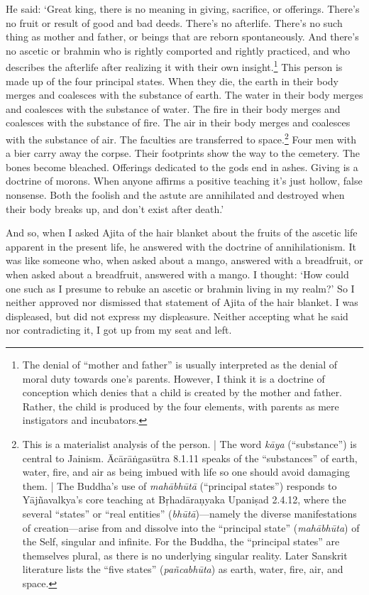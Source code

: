 \documentclass[12pt,openany]{book}%
\begin{document}
He said: ‘Great king, there is no meaning in giving, sacrifice, or offerings. There’s no fruit or result of good and bad deeds. There’s no afterlife. There’s no such thing as mother and father, or beings that are reborn spontaneously. And there’s no ascetic or brahmin who is rightly comported and rightly practiced, and who describes the afterlife after realizing it with their own insight.\footnote{The denial of “mother and father” is usually interpreted as the denial of moral duty towards one’s parents. However, I think it is a doctrine of conception which denies that a child is created by the mother and father. Rather, the child is produced by the four elements, with parents as mere instigators and incubators. } This person is made up of the four principal states. When they die, the earth in their body merges and coalesces with the substance of earth. The water in their body merges and coalesces with the substance of water. The fire in their body merges and coalesces with the substance of fire. The air in their body merges and coalesces with the substance of air. The faculties are transferred to space.\footnote{This is a materialist analysis of the person. | The word \textit{\textsanskrit{kāya}} (“substance”) is central to Jainism. \textsanskrit{Ācārāṅgasūtra} 8.1.11 speaks of the “substances” of earth, water, fire, and air as being imbued with life so one should avoid damaging them. | The Buddha’s use of \textit{\textsanskrit{mahābhūtā}} (“principal states”) responds to \textsanskrit{Yājñavalkya}’s core teaching at \textsanskrit{Bṛhadāraṇyaka} \textsanskrit{Upaniṣad} 2.4.12, where the several “states” or “real entities” (\textit{\textsanskrit{bhūtā}})—namely the diverse manifestations of creation—arise from and dissolve into the “principal state” (\textit{\textsanskrit{mahābhūta}}) of the Self, singular and infinite. For the Buddha, the “principal states” are themselves plural, as there is no underlying singular reality. Later Sanskrit literature lists the “five states” (\textit{\textsanskrit{pañcabhūta}}) as earth, water, fire, air, and space. } Four men with a bier carry away the corpse. Their footprints show the way to the cemetery. The bones become bleached. Offerings dedicated to the gods end in ashes. Giving is a doctrine of morons. When anyone affirms a positive teaching it’s just hollow, false nonsense. Both the foolish and the astute are annihilated and destroyed when their body breaks up, and don’t exist after death.’ 

And so, when I asked Ajita of the hair blanket about the fruits of the ascetic life apparent in the present life, he answered with the doctrine of annihilationism. It was like someone who, when asked about a mango, answered with a breadfruit, or when asked about a breadfruit, answered with a mango. I thought: ‘How could one such as I presume to rebuke an ascetic or brahmin living in my realm?’ So I neither approved nor dismissed that statement of Ajita of the hair blanket. I was displeased, but did not express my displeasure. Neither accepting what he said nor contradicting it, I got up from my seat and left. 
\end{document}
